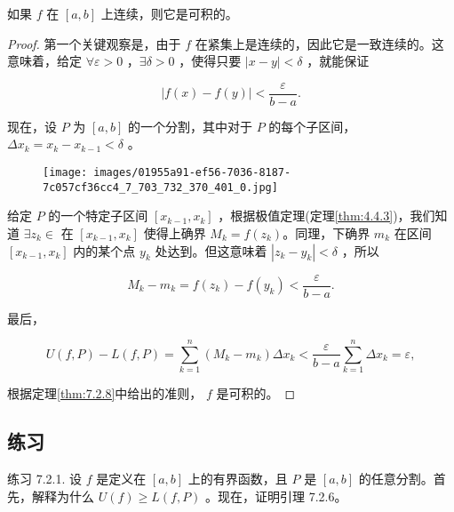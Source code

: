 \begin{Thm}
  \label{thm:7.2.9}
  如果 \(f\) 在 \(\left\lbrack  {a,b}\right\rbrack\) 上连续，则它是可积的。
\end{Thm}


\begin{proof}
  第一个关键观察是，由于 \(f\) 在紧集上是连续的，因此它是一致连续的。这意味着，给定 \( \forall\varepsilon  > 0\) ，\( \exists \delta  > 0\) ，使得只要 \(\left| {x - y}\right|  < \delta\) ，就能保证

\[
\left| {f\left( x\right)  - f\left( y\right) }\right|  < \frac{\varepsilon }{b - a}.
\]

现在，设 \(P\) 为 \(\left\lbrack  {a,b}\right\rbrack\) 的一个分割，其中对于 \(P\) 的每个子区间， \(\Delta {x}_{k} = {x}_{k} - {x}_{k - 1} < \delta\) 。

\begin{figure}[h]
  \centering
  \texttt{[image: images/01955a91-ef56-7036-8187-7c057cf36cc4\_7\_703\_732\_370\_401\_0.jpg]}
\end{figure}

给定 \(P\) 的一个特定子区间 \(\left\lbrack  {{x}_{k - 1},{x}_{k}}\right\rbrack\) ，根据极值定理(定理\ref{thm:4.4.3})，我们知道 \(\exists{z}_{k} \in\) 在 \(\left\lbrack  {{x}_{k - 1},{x}_{k}}\right\rbrack\)  使得上确界 \({M}_{k} = f\left( {z}_{k}\right)\)。同理，下确界 \({m}_{k}\) 在区间 \(\left\lbrack  {{x}_{k - 1},{x}_{k}}\right\rbrack\) 内的某个点 \({y}_{k}\) 处达到。但这意味着 \(\left| {{z}_{k} - {y}_{k}}\right|  < \delta\) ，所以

\[
{M}_{k} - {m}_{k} = f\left( {z}_{k}\right)  - f\left( {y}_{k}\right)  < \frac{\varepsilon }{b - a}.
\]

最后，

\[
U\left( {f,P}\right)  - L\left( {f,P}\right)  = \mathop{\sum }\limits_{{k = 1}}^{n}\left( {{M}_{k} - {m}_{k}}\right) \Delta {x}_{k} < \frac{\varepsilon }{b - a}\mathop{\sum }\limits_{{k = 1}}^{n}\Delta {x}_{k} = \varepsilon ,
\]

根据定理\ref{thm:7.2.8}中给出的准则， \(f\) 是可积的。
\end{proof}

\subsection{练习}

练习 7.2.1. 设 \(f\) 是定义在 \(\left\lbrack  {a,b}\right\rbrack\) 上的有界函数，且 \(P\) 是 \(\left\lbrack  {a,b}\right\rbrack\) 的任意分割。首先，解释为什么 \(U\left( f\right)  \geq  L\left( {f,P}\right)\) 。现在，证明引理 7.2.6。

